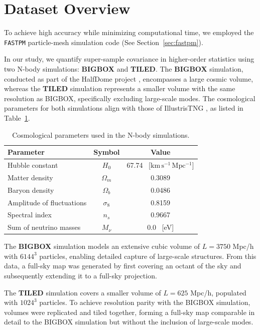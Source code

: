
\section{Dataset Overview}
To achieve high accuracy while minimizing computational time, we employed the \texttt{FASTPM} particle-mesh simulation code \citep{10.1093/mnras/stw2123} (See Section~\ref{sec:fastpm}).

In our study, we quantify super-sample covariance in higher-order statistics using two N-body simulations: \textbf{BIGBOX} and \textbf{TILED}. The \textbf{BIGBOX} simulation, conducted as part of the HalfDome project \citep{2024arXiv240717462B}, encompasses a large cosmic volume, whereas the \textbf{TILED} simulation represents a smaller volume with the same resolution as BIGBOX, specifically excluding large-scale modes. The cosmological parameters for both simulations align with those of IllustrisTNG \citep{2019ComAC...6....2N}, as listed in Table~\ref{tab:simulations}.

\begin{table}[h]
\centering
\begin{tabular}{lcc}
\toprule
\textbf{Parameter} & \textbf{Symbol} & \textbf{Value} \\
\midrule
Hubble constant & $H_0$ & 67.74 \, [$\mathrm{km\,s^{-1}\,Mpc^{-1}}$] \\ 
Matter density & $\Omega_m$ & 0.3089 \\
Baryon density & $\Omega_b$ & 0.0486 \\
Amplitude of fluctuations & $\sigma_8$ & 0.8159 \\
Spectral index & $n_s$ & 0.9667 \\
Sum of neutrino masses & $M_{\nu}$ & 0.0 \, [eV] \\
\bottomrule
\end{tabular}
\caption{Cosmological parameters used in the N-body simulations.}\label{tab:simulations}
\end{table}

The \textbf{BIGBOX} simulation models an extensive cubic volume of $L = 3750$ Mpc/h with $6144^3$ particles, enabling detailed capture of large-scale structures. From this data, a full-sky map was generated by first covering an octant of the sky and subsequently extending it to a full-sky projection.

The \textbf{TILED} simulation covers a smaller volume of $L = 625$ Mpc/h, populated with $1024^3$ particles. To achieve resolution parity with the BIGBOX simulation, volumes were replicated and tiled together, forming a full-sky map comparable in detail to the BIGBOX simulation but without the inclusion of large-scale modes.

